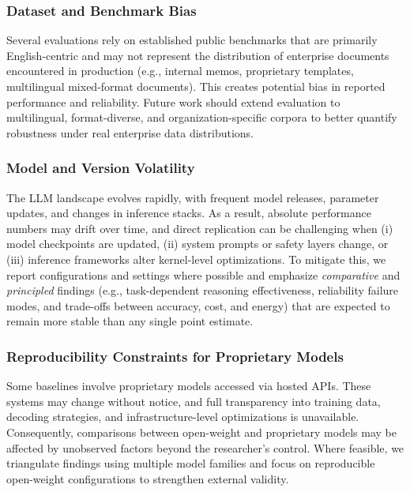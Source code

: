\subsubsection{Dataset and Benchmark Bias}
\label{sec:limitations-benchmark-bias}
Several evaluations rely on established public benchmarks that are primarily English-centric and may not represent the distribution of enterprise documents encountered in production (e.g., internal memos, proprietary templates, multilingual mixed-format documents). This creates potential bias in reported performance and reliability. Future work should extend evaluation to multilingual, format-diverse, and organization-specific corpora to better quantify robustness under real enterprise data distributions.

\subsubsection{Model and Version Volatility}
\label{sec:limitations-volatility}
The LLM landscape evolves rapidly, with frequent model releases, parameter updates, and changes in inference stacks. As a result, absolute performance numbers may drift over time, and direct replication can be challenging when (i) model checkpoints are updated, (ii) system prompts or safety layers change, or (iii) inference frameworks alter kernel-level optimizations. To mitigate this, we report configurations and settings where possible and emphasize \emph{comparative} and \emph{principled} findings (e.g., task-dependent reasoning effectiveness, reliability failure modes, and trade-offs between accuracy, cost, and energy) that are expected to remain more stable than any single point estimate.

\subsubsection{Reproducibility Constraints for Proprietary Models}
\label{sec:limitations-proprietary}
Some baselines involve proprietary models accessed via hosted APIs. These systems may change without notice, and full transparency into training data, decoding strategies, and infrastructure-level optimizations is unavailable. Consequently, comparisons between open-weight and proprietary models may be affected by unobserved factors beyond the researcher's control. Where feasible, we triangulate findings using multiple model families and focus on reproducible open-weight configurations to strengthen external validity.

